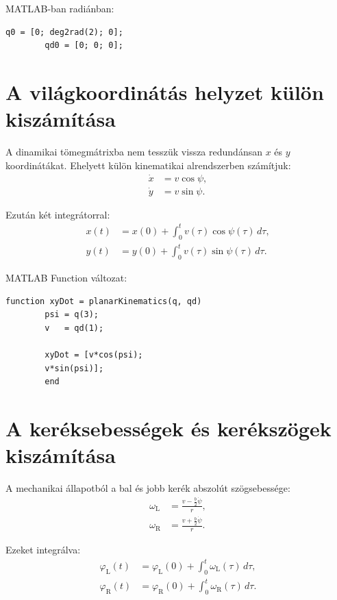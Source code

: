 \documentclass[12pt,a4paper]{article}
\newcommand{\phiL}{\varphi_{\mathrm{L}}}
\newcommand{\phiR}{\varphi_{\mathrm{R}}}
\newcommand{\omegaL}{\omega_{\mathrm{L}}}
\newcommand{\omegaR}{\omega_{\mathrm{R}}}
\begin{document}
	MATLAB-ban radiánban:
	\begin{lstlisting}[style=matlab]
		q0 = [0; deg2rad(2); 0];
		qd0 = [0; 0; 0];
	\end{lstlisting}
	
	\section{A világkoordinátás helyzet külön kiszámítása}
	
	A dinamikai tömegmátrixba nem tesszük vissza redundánsan $x$ és $y$ koordinátákat. Ehelyett külön kinematikai alrendszerben számítjuk:
	\begin{align}
		\dot x &= v\cos\psi,\\
		\dot y &= v\sin\psi.
	\end{align}
	
	Ezután két integrátorral:
	\begin{align}
		x(t)&=x(0)+\int_0^t v(\tau)\cos\psi(\tau)\,d\tau,\\
		y(t)&=y(0)+\int_0^t v(\tau)\sin\psi(\tau)\,d\tau.
	\end{align}
	
	MATLAB Function változat:
	\begin{lstlisting}[style=matlab]
		function xyDot = planarKinematics(q, qd)
		psi = q(3);
		v   = qd(1);
		
		xyDot = [v*cos(psi);
		v*sin(psi)];
		end
	\end{lstlisting}
	
	\section{A keréksebességek és kerékszögek kiszámítása}
	
	A mechanikai állapotból a bal és jobb kerék abszolút szögsebessége:
	\begin{align}
		\omegaL &= \frac{v-\frac{b}{2}\dot\psi}{r},\\
		\omegaR &= \frac{v+\frac{b}{2}\dot\psi}{r}.
	\end{align}
	
	Ezeket integrálva:
	\begin{align}
		\phiL(t)&=\phiL(0)+\int_0^t\omegaL(\tau)\,d\tau,\\
		\phiR(t)&=\phiR(0)+\int_0^t\omegaR(\tau)\,d\tau.
	\end{align}
	
\end{document}
